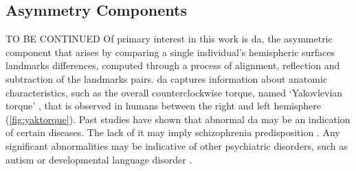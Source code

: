  
\subsection{Asymmetry Components}
TO BE CONTINUED
Of primary interest in this work is \ac{da}, the asymmetric component that arises by comparing a single individual's hemispheric surfaces landmarks differences, computed through a process of alignment, reflection and subtraction of the landmarks pairs. \ac{da} captures information about anatomic characteristics, such as the overall counterclockwise torque, named `Yakovlevian torque' \cite{LeMay1976}, that is observed in humans between the right and left hemisphere (\autoref{fig:yaktorque}). Past studies have shown that abnormal \ac{da} may be an indication of certain diseases. The lack of it may imply schizophrenia predisposition \cite{Ribolsi2014}. Any significant abnormalities may be indicative of other psychiatric disorders, such as autism or developmental language disorder \cite{Herbert2005}\cite{Kong2022}. 

